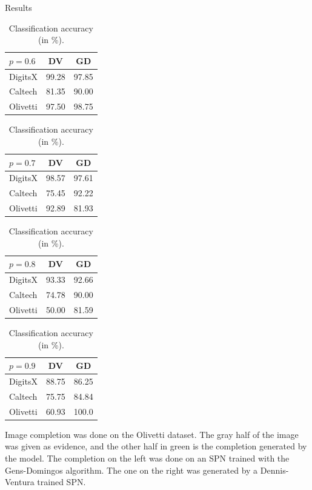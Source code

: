 \documentclass[final,hyperref={pdfpagelabels=false},notheorems]{beamer}
\theoremstyle{thesisstyle}
\newcommand{\pskip}{\vskip 0.5cm}
\begin{document}
\begin{frame}[t]
\begin{columns}[t]
\begin{column}{.505\textwidth}
\begin{block}{Results}
\begin{table}[h]
        \begin{tabular}{l|c|c}
          $p=0.6$ & DV & GD\\
          \hline
          DigitsX & 99.28 & 97.85\\
          Caltech & 81.35 & 90.00\\
          Olivetti& 97.50 & 98.75\\
        \end{tabular}
        \begin{tabular}{l|c|c}
          $p=0.7$ & DV & GD\\
          \hline
          DigitsX & 98.57 & 97.61\\
          Caltech & 75.45 & 92.22\\
          Olivetti& 92.89 & 81.93\\
        \end{tabular}\hspace{2.5cm}
        \begin{tabular}{l|c|c}
          $p=0.8$ & DV & GD\\
          \hline
          DigitsX & 93.33 & 92.66\\
          Caltech & 74.78 & 90.00\\
          Olivetti& 50.00 & 81.59\\
        \end{tabular}\hspace{2.5cm}
        \begin{tabular}{l|c|c}
          $p=0.9$ & DV & GD\\
          \hline
          DigitsX & 88.75 & 86.25\\
          Caltech & 75.75 & 84.84\\
          Olivetti& 60.93 & 100.0\\
        \end{tabular}
        \caption{Classification accuracy (in \%).}
      \end{table}\pskip

      Image completion was done on the Olivetti dataset. The gray half of the image was given as
      evidence, and the other half in green is the completion generated by the model. The
      completion on the left was done on an SPN trained with the Gens-Domingos algorithm. The one
      on the right was generated by a Dennis-Ventura trained SPN.\pskip


\end{block}
\end{column}
\end{columns}
\end{frame}
\end{document}
